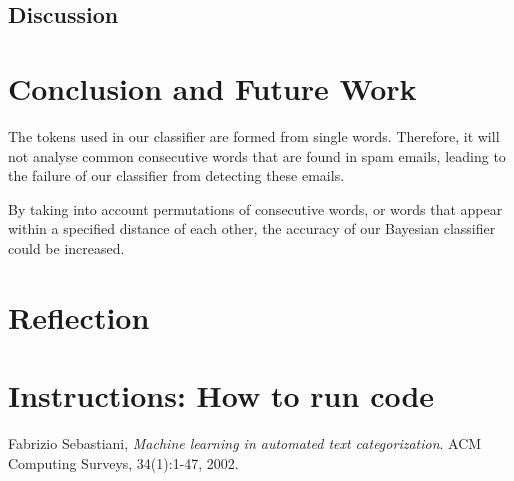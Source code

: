 \documentclass[10pt, a4paper]{article}
\begin{document}
\subsection{Discussion}

\section{Conclusion and Future Work}

The tokens used in our classifier are formed from single words. Therefore, it will not analyse common consecutive words that are found in spam emails, leading to the failure of our classifier from detecting these emails.

By taking into account permutations of consecutive words, or words that appear within a specified distance of each other, the accuracy of our Bayesian classifier could be increased.

\section{Reflection}

\section{Instructions: How to run code}

\begin{thebibliography}{9}

  Fabrizio Sebastiani,
  \emph{Machine learning in automated text categorization}.
  ACM Computing Surveys,
  34(1):1-47,
  2002.

\end{thebibliography}
\end{document}
